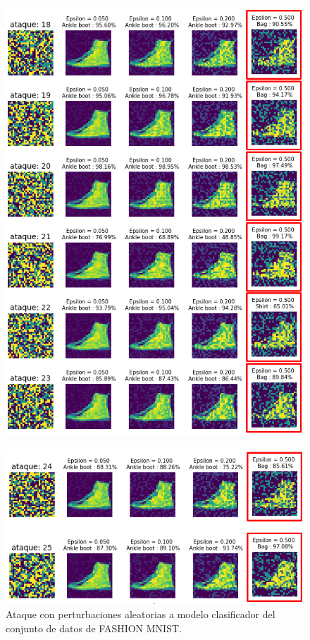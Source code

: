 \begin{figure}[!h]
    \centering
    \includegraphics[scale = 0.85]{Figures/figura_67_4.PNG}
    \label{fig:67_4}
\end{figure}

\begin{figure}[!h]
    \centering
    \includegraphics[scale = 0.85]{Figures/figura_67_5.PNG}
    \decoRule
    \caption[Ataque con perturbaciones aleatorias]{Ataque con perturbaciones aleatorias a modelo clasificador del conjunto de datos de FASHION MNIST.}
    \label{fig:6_5}
\end{figure}
